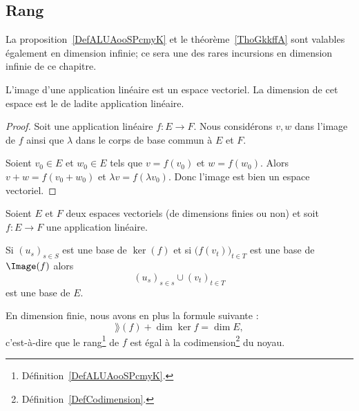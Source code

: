 \subsection{Rang}

La proposition~\ref{DefALUAooSPcmyK} et le théorème~\ref{ThoGkkffA} sont valables également en dimension infinie; ce sera une des rares incursions en dimension infinie de ce chapitre.
\begin{propositionDef}\label{DefALUAooSPcmyK}
    L'image d'une application linéaire est un espace vectoriel. La dimension de cet espace est le  de ladite application linéaire.
\end{propositionDef}

\begin{proof}
    Soit une application linéaire \( f\colon E\to F\). Nous considérons \( v,w\) dans l'image de \( f\) ainsi que \( \lambda\) dans le corps de base commun à \( E\) et \( F\).

    Soient \( v_0\in E\) et \( w_0\in E\) tels que \( v=f(v_0)\) et \( w=f(w_0)\). Alors \( v+w=f(v_0+w_0)\) et \( \lambda v=f(\lambda v_0)\). Donc l'image est bien un espace vectoriel.
\end{proof}

\begin{theorem}       \label{ThoGkkffA}
    Soient \( E\) et \( F\) deux espaces vectoriels (de dimensions finies ou non) et soit \( f\colon E\to F\) une application linéaire. 
    
   Si \( (u_s)_{s\in S}\) est une base de \( \ker(f)\) et si \( \big( f(v_t) \big)_{t\in T}\) est une base de \( \Image(f)\) alors 
   \begin{equation}
   (u_s)_{s\in s}\cup (v_t)_{t\in T}
   \end{equation}
   est une base de \( E\).
    
   En dimension finie, nous avons en plus la formule suivante :
   \begin{equation}
       \rang(f)+\dim\ker f=\dim E,
   \end{equation}
   c'est-à-dire que le rang\footnote{Définition~\ref{DefALUAooSPcmyK}.} de \( f\) est égal à la codimension\footnote{Définition~\ref{DefCodimension}.} du noyau.
\end{theorem}

